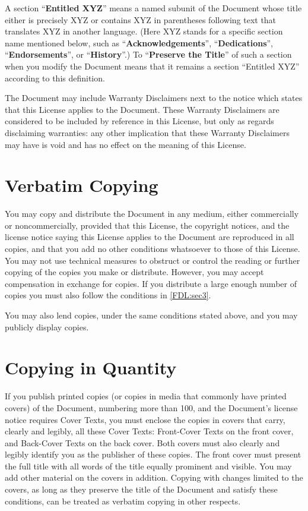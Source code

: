 \documentclass[12pt,a4paper,openany]{book}
\begin{document}
A section “\textbf{Entitled XYZ}” means a named subunit of the Document
whose title either is precisely XYZ or contains XYZ in parentheses
following text that translates XYZ in another language.  (Here XYZ stands
for a specific section name mentioned below, such as
“\textbf{Acknowledgements}”, “\textbf{Dedications}”,
“\textbf{Endorsements}”, or “\textbf{History}”.) To “\textbf{Preserve the
Title}” of such a section when you modify the Document means that it
remains a section “Entitled XYZ” according to this definition.

The Document may include Warranty Disclaimers next to the notice which
states that this License applies to the Document.  These Warranty
Disclaimers are considered to be included by reference in this
License, but only as regards disclaiming warranties: any other
implication that these Warranty Disclaimers may have is void and has
no effect on the meaning of this License.

\section{Verbatim Copying}
\label{FDL:sec2}

You may copy and distribute the Document in any medium, either commercially
or noncommercially, provided that this License, the copyright notices, and
the license notice saying this License applies to the Document are
reproduced in all copies, and that you add no other conditions whatsoever
to those of this License.  You may not use technical measures to obstruct
or control the reading or further copying of the copies you make or
distribute.  However, you may accept compensation in exchange for copies.
If you distribute a large enough number of copies you must also follow the
conditions in \autoref{FDL:sec3}.

You may also lend copies, under the same conditions stated above, and
you may publicly display copies.

\section{Copying in Quantity}
\label{FDL:sec3}

If you publish printed copies (or copies in media that commonly have
printed covers) of the Document, numbering more than 100, and the
Document’s license notice requires Cover Texts, you must enclose the
copies in covers that carry, clearly and legibly, all these Cover
Texts: Front-Cover Texts on the front cover, and Back-Cover Texts on
the back cover.  Both covers must also clearly and legibly identify
you as the publisher of these copies.  The front cover must present
the full title with all words of the title equally prominent and
visible.  You may add other material on the covers in addition.
Copying with changes limited to the covers, as long as they preserve
the title of the Document and satisfy these conditions, can be treated
as verbatim copying in other respects.
\end{document}
